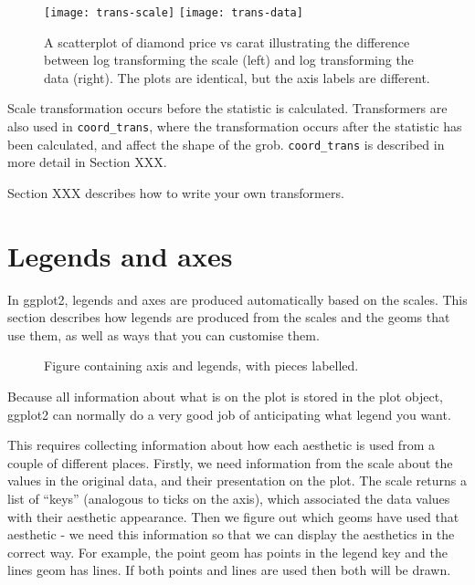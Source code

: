 \begin{figure}[htbp]
  \centering
    \texttt{[image: trans-scale]}%
    \texttt{[image: trans-data]}
  \caption{A scatterplot of diamond price vs carat illustrating the difference between log transforming the scale (left) and log transforming the data (right).  The plots are identical, but the axis labels are different.}
  \label{fig:trans}
\end{figure}

Scale transformation occurs before the statistic is calculated.  Transformers are also used in \verb|coord_trans|, where the transformation occurs after the statistic has been calculated, and affect the shape of the grob.  \verb|coord_trans| is described in more detail in Section XXX.

Section XXX describes how to write your own transformers.

\section{Legends and axes}
\label{sec:legends_and_axes}

In ggplot2, legends and axes are produced automatically based on the scales.  This section describes how legends are produced from the scales and the geoms that use them, as well as ways that you can customise them.

\begin{figure}[htbp]
  \centering
  \caption{Figure containing axis and legends, with pieces labelled.  }
  \label{fig:label}
\end{figure}

Because all information about what is on the plot is stored in the plot object, ggplot2 can normally do a very good job of anticipating what legend you want.  

This requires collecting information about how each aesthetic is used from a couple of different places.  Firstly, we need information from the scale about the values in the original data, and their presentation on the plot.  The scale returns a list of ``keys'' (analogous to ticks on the axis), which associated the data values with their aesthetic appearance.  Then we figure out which geoms have used that aesthetic - we need this information so that we can display the aesthetics in the correct way.  For example, the point geom has points in the legend key and the lines geom has lines.  If both points and lines are used then both will be drawn.


